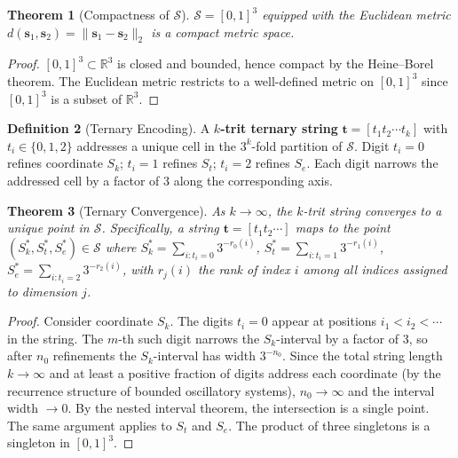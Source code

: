 \documentclass[11pt,twocolumn,a4paper]{article}
\newtheorem{theorem}{Theorem}[section]
\theoremstyle{definition}
\newtheorem{definition}[theorem]{Definition}
\theoremstyle{remark}
\newcommand{\Sk}{S_k}
\newcommand{\St}{S_t}
\newcommand{\Se}{S_e}
\newcommand{\Sspace}{\mathcal{S}}
\begin{document}
\begin{theorem}[Compactness of $\Sspace$]
\label{thm:compact}
$\Sspace = [0,1]^3$ equipped with the Euclidean metric $d(\mathbf{s}_1, \mathbf{s}_2) = \|\mathbf{s}_1 - \mathbf{s}_2\|_2$ is a compact metric space.
\end{theorem}

\begin{proof}
$[0,1]^3 \subset \mathbb{R}^3$ is closed and bounded, hence compact by the Heine--Borel theorem. The Euclidean metric restricts to a well-defined metric on $[0,1]^3$ since $[0,1]^3$ is a subset of $\mathbb{R}^3$.
\end{proof}

\begin{definition}[Ternary Encoding]
\label{def:ternary}
A \textbf{$k$-trit ternary string} $\mathbf{t} = [t_1 t_2 \cdots t_k]$ with $t_i \in \{0, 1, 2\}$ addresses a unique cell in the $3^k$-fold partition of $\Sspace$. Digit $t_i = 0$ refines coordinate $\Sk$; $t_i = 1$ refines $\St$; $t_i = 2$ refines $\Se$. Each digit narrows the addressed cell by a factor of 3 along the corresponding axis.
\end{definition}

\begin{theorem}[Ternary Convergence]
\label{thm:ternary}
As $k \to \infty$, the $k$-trit string converges to a unique point in $\Sspace$. Specifically, a string $\mathbf{t} = [t_1 t_2 \cdots]$ maps to the point $(\Sk^*, \St^*, \Se^*) \in \Sspace$ where $\Sk^* = \sum_{i : t_i = 0} 3^{-r_0(i)}$, $\St^* = \sum_{i : t_i = 1} 3^{-r_1(i)}$, $\Se^* = \sum_{i : t_i = 2} 3^{-r_2(i)}$, with $r_j(i)$ the rank of index $i$ among all indices assigned to dimension $j$.
\end{theorem}

\begin{proof}
Consider coordinate $\Sk$. The digits $t_i = 0$ appear at positions $i_1 < i_2 < \cdots$ in the string. The $m$-th such digit narrows the $\Sk$-interval by a factor of 3, so after $n_0$ refinements the $\Sk$-interval has width $3^{-n_0}$. Since the total string length $k \to \infty$ and at least a positive fraction of digits address each coordinate (by the recurrence structure of bounded oscillatory systems), $n_0 \to \infty$ and the interval width $\to 0$. By the nested interval theorem, the intersection is a single point. The same argument applies to $\St$ and $\Se$. The product of three singletons is a singleton in $[0,1]^3$.
\end{proof}
\end{document}
